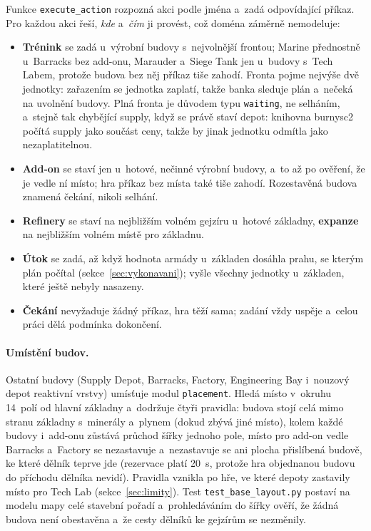Funkce \texttt{execute\_action} rozpozná akci podle jména a~zadá odpovídající příkaz. Pro každou akci řeší, \emph{kde} a~\emph{čím} ji provést, což doména záměrně nemodeluje:
\begin{itemize}
	\item \textbf{Trénink} se zadá u~výrobní budovy s~nejvolnější frontou; Marine přednostně u~Barracks bez add-onu, Marauder a~Siege Tank jen u~budovy s~Tech Labem, protože budova bez něj příkaz tiše zahodí. Fronta pojme nejvýše dvě jednotky: zařazením se jednotka zaplatí, takže banka sleduje plán a~nečeká na uvolnění budovy. Plná fronta je důvodem typu \texttt{waiting}, ne selháním, a~stejně tak chybějící supply, když se právě staví depot: knihovna burnysc2 počítá supply jako součást ceny, takže by jinak jednotku odmítla jako nezaplatitelnou.
	\item \textbf{Add-on} se staví jen u~hotové, nečinné výrobní budovy, a~to až po ověření, že je vedle ní místo; hra příkaz bez místa také tiše zahodí. Rozestavěná budova znamená čekání, nikoli selhání.
	\item \textbf{Refinery} se staví na nejbližším volném gejzíru u~hotové základny, \textbf{expanze} na nejbližším volném místě pro základnu.
	\item \textbf{Útok} se zadá, až když hodnota armády u~základen dosáhla prahu, se kterým plán počítal (sekce~\ref{sec:vykonavani}); vyšle všechny jednotky u~základen, které ještě nebyly nasazeny.
	\item \textbf{Čekání} nevyžaduje žádný příkaz, hra těží sama; zadání vždy uspěje a~celou práci dělá podmínka dokončení.
\end{itemize}

\paragraph{Umístění budov.} Ostatní budovy (Supply Depot, Barracks, Factory, Engineering Bay i~nouzový depot reaktivní vrstvy) umísťuje modul \texttt{placement}. Hledá místo v~okruhu 14~polí od hlavní základny a~dodržuje čtyři pravidla: budova stojí celá mimo stranu základny s~minerály a~plynem (dokud zbývá jiné místo), kolem každé budovy i~add-onu zůstává průchod šířky jednoho pole, místo pro add-on vedle Barracks a~Factory se nezastavuje a~nezastavuje se ani plocha přislíbená budově, ke které dělník teprve jde (rezervace platí 20~s, protože hra objednanou budovu do příchodu dělníka nevidí). Pravidla vznikla po hře, ve které depoty zastavily místo pro Tech Lab (sekce~\ref{sec:limity}). Test \texttt{test\_base\_layout.py} postaví na modelu mapy celé stavební pořadí a~prohledáváním do šířky ověří, že žádná budova není obestavěna a~že cesty dělníků ke gejzírům se nezměnily.

